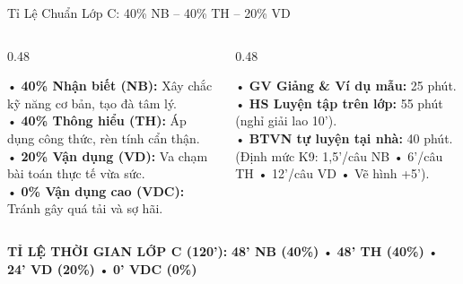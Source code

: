 \documentclass[aspectratio=169,11pt]{beamer}
\begin{document}
\begin{frame}{Tỉ Lệ Chuẩn Lớp C: 40\% NB – 40\% TH – 20\% VD}
  \begin{columns}[T]
    \begin{column}{0.48\textwidth}
      \begin{tcolorbox}[slidecard, title=Công Thức Phân Bổ Năng Lực]
        \scriptsize
        • \textbf{40\% Nhận biết (NB):} Xây chắc kỹ năng cơ bản, tạo đà tâm lý.\\[3pt]
        • \textbf{40\% Thông hiểu (TH):} Áp dụng công thức, rèn tính cẩn thận.\\[3pt]
        • \textbf{20\% Vận dụng (VD):} Va chạm bài toán thực tế vừa sức.\\[3pt]
        • \textbf{0\% Vận dụng cao (VDC):} Tránh gây quá tải và sợ hãi.
      \end{tcolorbox}
    \end{column}

    \begin{column}{0.48\textwidth}
      \begin{tcolorbox}[accentcard, title=Định Mức Thời Lượng Ca Học 90 Phút]
        \scriptsize
        • \textbf{GV Giảng \& Ví dụ mẫu:} 25 phút.\\[3pt]
        • \textbf{HS Luyện tập trên lớp:} 55 phút (nghỉ giải lao 10').\\[3pt]
        • \textbf{BTVN tự luyện tại nhà:} 40 phút.\\[3pt]
        {\color{muted}(Định mức K9: 1,5'/câu NB • 6'/câu TH • 12'/câu VD • Vẽ hình +5').}
      \end{tcolorbox}
    \end{column}
  \end{columns}
  \vspace{3pt}
  \begin{tcolorbox}[slidecard]
    \centering\scriptsize
    \textbf{TỈ LỆ THỜI GIAN LỚP C (120'):} {\color{brand}\textbf{48' NB (40\%)}} • {\color{success}\textbf{48' TH (40\%)}} • {\color{accent}\textbf{24' VD (20\%)}} • {\color{danger}\textbf{0' VDC (0\%)}}
  \end{tcolorbox}
\end{frame}
\end{document}
